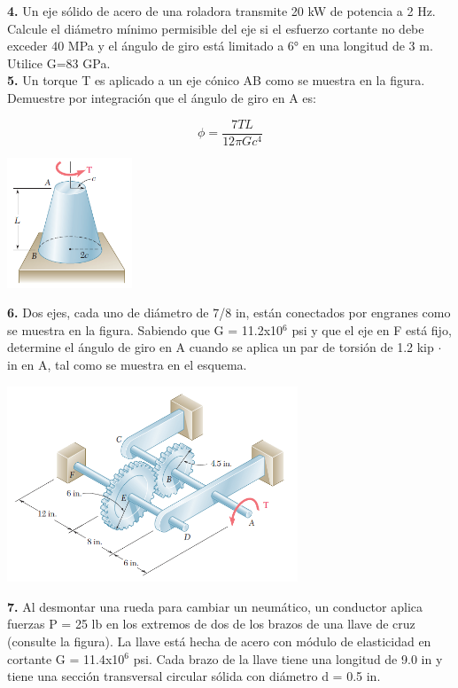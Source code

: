 \documentclass[12pt,letterpaper]{article}
\begin{document}
\textbf{4.} Un eje sólido de acero de una roladora transmite 20 kW de potencia a 2 Hz. Calcule 
el diámetro mínimo permisible del eje si el esfuerzo cortante no debe exceder 40 MPa y el 
ángulo de giro está limitado a 6° en una longitud de 3 m. Utilice G=83 GPa. \\ 

\textbf{5.} Un torque T es aplicado a un eje cónico AB como se muestra en la figura. Demuestre 
por integración que el ángulo de giro en A es:

$$ \phi = \frac{7TL}{12\pi G c^4} $$

\begin{center}
\includegraphics[width=0.28\textwidth]{img/p5.PNG}
\end{center}

\textbf{6.} Dos ejes, cada uno de diámetro de 7/8 in, están conectados por engranes como se muestra 
en la figura. Sabiendo que G = 11.2x10$^6$ psi y que el eje en F está fijo, determine el ángulo de giro 
en A cuando se aplica un par de torsión de 1.2 kip $\cdot$ in en A, tal como se muestra en el esquema.

\begin{center}
\includegraphics[width=0.65\textwidth]{img/p6.PNG}
\end{center}

\textbf{7.} Al desmontar una rueda para cambiar un neumático,
un conductor aplica fuerzas P = 25 lb en los extremos de dos
de los brazos de una llave de cruz (consulte la figura). La llave
está hecha de acero con módulo de elasticidad en cortante
G = 11.4x10$^6$ psi. Cada brazo de la llave tiene una longitud
de 9.0 in y tiene una sección transversal circular sólida con
diámetro d = 0.5 in.
\end{document}
